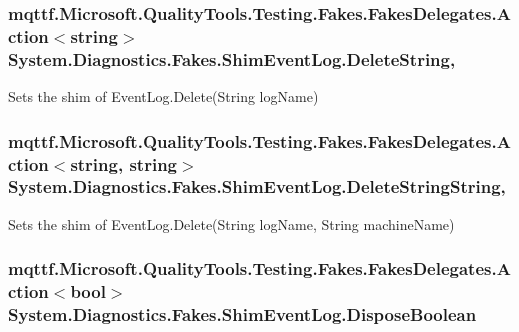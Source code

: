 \hypertarget{class_system_1_1_diagnostics_1_1_fakes_1_1_shim_event_log_ae24c5d172e64923387fe3a51c8167cd2}{
\subsubsection[{Delete\-String}]{\setlength{\rightskip}{0pt plus 5cm}mqttf.\-Microsoft.\-Quality\-Tools.\-Testing.\-Fakes.\-Fakes\-Delegates.\-Action$<$string$>$ System.\-Diagnostics.\-Fakes.\-Shim\-Event\-Log.\-Delete\-String\hspace{0.3cm}{\ttfamily [static]}, {\ttfamily [set]}}}\label{class_system_1_1_diagnostics_1_1_fakes_1_1_shim_event_log_ae24c5d172e64923387fe3a51c8167cd2}


Sets the shim of Event\-Log.\-Delete(\-String log\-Name)

\hypertarget{class_system_1_1_diagnostics_1_1_fakes_1_1_shim_event_log_a71464bcba246f1e8cacb0d9a7d8c17e4}{
\subsubsection[{Delete\-String\-String}]{\setlength{\rightskip}{0pt plus 5cm}mqttf.\-Microsoft.\-Quality\-Tools.\-Testing.\-Fakes.\-Fakes\-Delegates.\-Action$<$string, string$>$ System.\-Diagnostics.\-Fakes.\-Shim\-Event\-Log.\-Delete\-String\-String\hspace{0.3cm}{\ttfamily [static]}, {\ttfamily [set]}}}\label{class_system_1_1_diagnostics_1_1_fakes_1_1_shim_event_log_a71464bcba246f1e8cacb0d9a7d8c17e4}


Sets the shim of Event\-Log.\-Delete(\-String log\-Name, String machine\-Name)

\hypertarget{class_system_1_1_diagnostics_1_1_fakes_1_1_shim_event_log_adf5ff350d35afe036bd60f1ad692601d}{
\subsubsection[{Dispose\-Boolean}]{\setlength{\rightskip}{0pt plus 5cm}mqttf.\-Microsoft.\-Quality\-Tools.\-Testing.\-Fakes.\-Fakes\-Delegates.\-Action$<$bool$>$ System.\-Diagnostics.\-Fakes.\-Shim\-Event\-Log.\-Dispose\-Boolean\hspace{0.3cm}{\ttfamily [set]}}}\label{class_system_1_1_diagnostics_1_1_fakes_1_1_shim_event_log_adf5ff350d35afe036bd60f1ad692601d}


